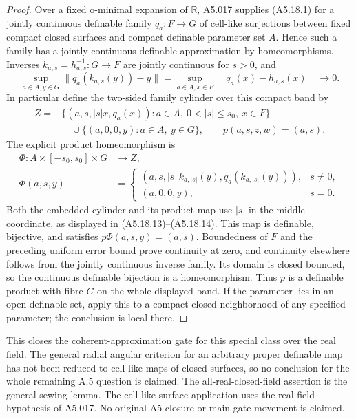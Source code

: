 \begin{proof}
Over a fixed o-minimal expansion of $\mathbb R$, A5.017 supplies (A5.18.1) for
a jointly continuous definable family $q_a:F\to G$ of cell-like surjections
between fixed compact closed surfaces and compact definable parameter set
$A$. Hence such a family has a jointly continuous definable approximation
by homeomorphisms. Inverses $k_{a,s}=h_{a,s}^{-1}:G\to F$ are jointly
continuous for $s>0$, and
\[
 \sup_{a\in A,y\in G}\|q_a(k_{a,s}(y))-y\|
 =\sup_{a\in A,x\in F}\|q_a(x)-h_{a,s}(x)\|\longrightarrow0.
\]
In particular define the two-sided family cylinder over this compact band
by
\[
\begin{split}
 Z={}&\{(a,s,|s|x,q_a(x)):a\in A,\ 0<|s|\le s_0,\ x\in F\}\\
 &\quad\cup\{(a,0,0,y):a\in A,\ y\in G\},
 \qquad p(a,s,z,w)=(a,s).
\end{split}
\tag{A5.18.13}
\]
The explicit product homeomorphism is
\[
\begin{split}
 \Phi:A\times[-s_0,s_0]\times G&\longrightarrow Z,\\
 \Phi(a,s,y)&=
 \begin{cases}
 (a,s,|s|\,k_{a,|s|}(y),q_a(k_{a,|s|}(y))),&s\ne0,\\
 (a,0,0,y),&s=0.
 \end{cases}
\end{split}
\tag{A5.18.14}
\]
Both the embedded cylinder and its product map use $|s|$ in the middle
coordinate, as displayed in (A5.18.13)--(A5.18.14). This map is
definable, bijective, and satisfies $p\Phi(a,s,y)=(a,s)$. Boundedness of
$F$ and the preceding uniform error bound prove continuity at zero, and
continuity elsewhere follows from the jointly continuous inverse family.
Its domain is closed bounded, so the continuous definable bijection is a
homeomorphism. Thus $p$ is a definable product with fibre $G$ on the whole
displayed band. If the parameter lies in an open definable set, apply this
to a compact closed neighborhood of any specified parameter; the conclusion
is local there.

\end{proof}

This closes the coherent-approximation gate for this special class
over the real field. The general radial angular criterion for an arbitrary
proper definable map has not been reduced to cell-like maps of closed
surfaces, so no conclusion for the whole remaining A.5 question is claimed.
The all-real-closed-field assertion is the general sewing lemma. The cell-like
surface application uses the real-field hypothesis of A5.017. No original A5
closure or main-gate movement is claimed.
